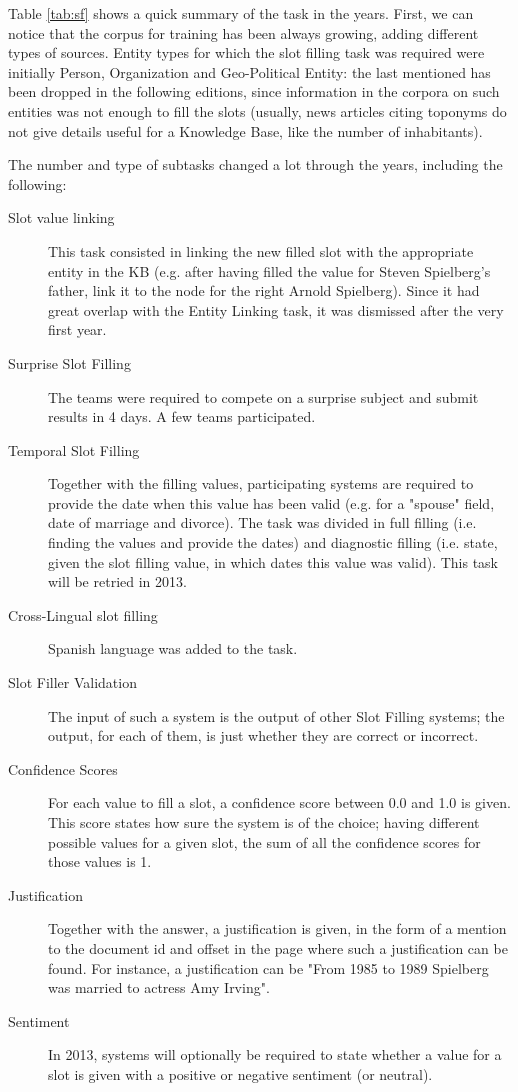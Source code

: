 \documentclass[a4paper,11pt]{report}
\begin{document}
Table \ref{tab:sf} shows a quick summary of the task in the years. First, we can notice that the corpus for training has been always growing, adding different types of sources. Entity types for which the slot filling task was required were initially Person, Organization and Geo-Political Entity: the last mentioned has been dropped in the following editions, since information in the corpora on such entities was not enough to fill the slots (usually, news articles citing toponyms do not give details useful for a Knowledge Base, like the number of inhabitants).

The number and type of subtasks changed a lot through the years, including the following:

\begin{description}
\item[Slot value linking] This task consisted in linking the new filled slot with the appropriate entity in the KB (e.g. after having filled the value for Steven Spielberg's father, link it to the node for the right Arnold Spielberg). Since it had great overlap with the Entity Linking task, it was dismissed after the very first year.
\item[Surprise Slot Filling] The teams were required to compete on a surprise subject and submit results in 4 days. A few teams participated.
\item[Temporal Slot Filling] Together with the filling values, participating systems are required to provide the date when this value has been valid (e.g. for a "spouse" field, date of marriage and divorce). The task was divided in full filling (i.e. finding the values and provide the dates) and diagnostic filling (i.e. state, given the slot filling value, in which dates this value was valid). This task will be retried in 2013.
\item[Cross-Lingual slot filling] Spanish language was added to the task.
\item[Slot Filler Validation] The input of such a system is the output of other Slot Filling systems; the output, for each of them, is just whether they are correct or incorrect.
\item[Confidence Scores] For each value to fill a slot, a confidence score between 0.0 and 1.0 is given. This score states how sure the system is of the choice; having different possible values for a given slot, the sum of all the confidence scores for those values is 1.
\item[Justification] Together with the answer, a justification is given, in the form of a mention to the document id and offset in the page where such a justification can be found. For instance, a justification can be "From 1985 to 1989 Spielberg was married to actress Amy Irving".
\item[Sentiment] In 2013, systems will optionally be required to state whether a value for a slot is given with a positive or negative sentiment (or neutral).
\end{description}
\end{document}
